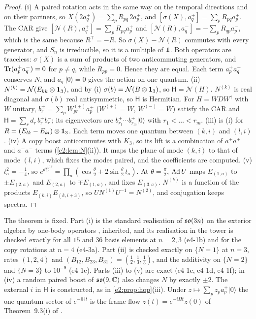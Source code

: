 \begin{proof}
(i) A paired rotation acts in the same way on the temporal directions and on their partners, so $X(2a^\pm_q)=\sum_pR_{pq}\,2a^\pm_p$, and
$[\sigma(X),a^\pm_q]=\sum_pR_{pq}a^\pm_p$. The CAR give $[\mathcal N(R),a^+_q]=\sum_pR_{pq}a^+_p$ and $[\mathcal N(R),a^-_q]=-\sum_pR_{qp}a^-_p$,
which is the same because $R^{\!\top}=-R$. So $\sigma(X)-\mathcal N(R)$ commutes with every generator, and $S_n$ is irreducible, so it is a multiple
of $\mathbf 1$. Both operators are traceless: $\sigma(X)$ is a sum of products of two anticommuting generators, and $\operatorname{Tr}(a^+_pa^-_q)=0$ for $p\neq q$, while
$R_{pp}=0$. Hence they are equal. Each term $a^+_pa^-_q$ conserves $N$, and $a^-_q|0\rangle=0$ gives the action on one quantum. (ii)
$N^{(k)}=\mathcal N(E_{kk}\otimes\mathbf 1_3)$, and by (i) $\sigma(b)=\mathcal N(B\otimes\mathbf 1_3)$, so $\mathsf H=\mathcal N(H)$. $N^{(k)}$ is real diagonal and
$\sigma(b)$ real antisymmetric, so $\mathsf H$ is Hermitian. For $H=WDW^\dagger$ with $W$ unitary, $b^\pm_r=\sum_pW_{pr}^{(\pm)}a^\pm_p$ ($W^{(+)}=W$,
$W^{(-)}=\bar W$) satisfy the CAR and $\mathsf H=\sum_rd_r\,b^+_rb^-_r$; its eigenvectors are $b^+_{r_1}\cdots b^+_{r_m}|0\rangle$ with $r_1<\dots<r_m$. (iii) is
(i) for $R=(E_{lk}-E_{kl})\otimes\mathbf 1_3$. Each term moves one quantum between $(k,i)$ and $(l,i)$. (iv) A copy boost anticommutes with $K_3$, so its
lift is a combination of $a^+a^+$ and $a^-a^-$ terms (\cref{e2:lem:N}(ii)). It maps the plane of mode $(k,i)$ to that of mode $(l,i)$, which fixes
the modes paired, and the coefficients are computed. (v) $t_a^2=-\tfrac14$, so
$e^{\theta\hat C^{12}}=\prod_a(\cos\tfrac\theta2+2\sin\tfrac\theta2\,t_a)$. At $\theta=\tfrac\pi2$, $\operatorname{Ad} U$ maps $E_{(1,a)}$ to $\pm E_{(2,a)}$ and $E_{(2,a)}$ to
$\mp E_{(1,a)}$, and fixes $E_{(3,a)}$. $N^{(k)}$ is a function of the products $E_{(k,i)}E_{(k,i+3)}$, so $UN^{(1)}U^{-1}=N^{(2)}$, and conjugation keeps
spectra.
\end{proof}

The theorem is fixed. Part (i) is the standard realisation of $\mathfrak{so}(3n)$ on the exterior algebra by one-body operators
\cite{Chevalley54,Fock32}, inherited, and its realisation in the tower is checked exactly for all $15$ and $36$ basis elements at $n=2,3$
(e4-1b) and for the copy rotations at $n=4$ (e4-3a). Part (ii) is checked exactly on $\{N=1\}$ at $n=3$, rates $(1,2,4)$ and
$(B_{12},B_{23},B_{31})=(\tfrac12,\tfrac13,\tfrac15)$, and the additivity on $\{N=2\}$ and $\{N=3\}$ to $10^{-9}$ (e4-1e). Parts (iii) to (v) are exact
(e4-1c, e4-1d, e4-1f); in (iv) a random paired boost of $\mathfrak{so}(9,\mathbb{C})$ also changes $N$ by exactly $\pm2$. The external $i$ in $\mathsf H$ is constructed,
as in \cref{e2:prop:hop}(iii). Under $z\mapsto\sum_pz_pa^+_p|0\rangle$ the one-quantum sector of $e^{-i\mathsf Ht}$ is the frame flow $z(t)=e^{-iHt}z(0)$ of
Theorem~9.3(i) of \cite{RE}.

